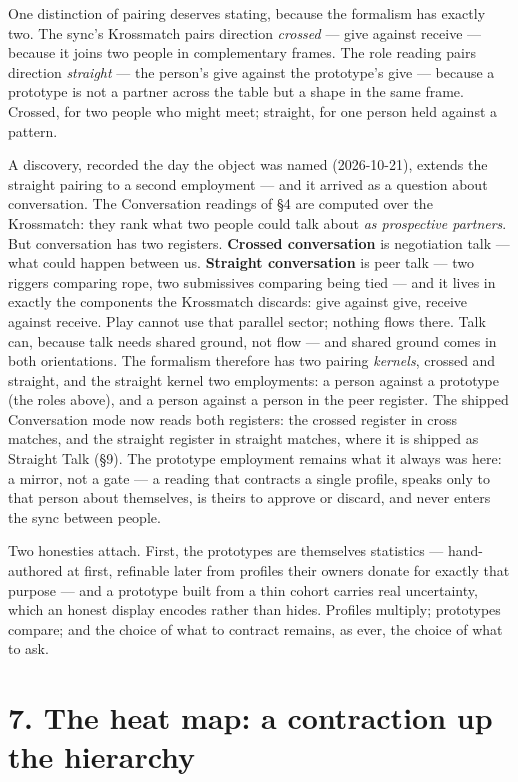 One distinction of pairing deserves stating, because the formalism has
exactly two. The sync's Krossmatch pairs direction \emph{crossed} ---
give against receive --- because it joins two people in complementary
frames. The role reading pairs direction \emph{straight} --- the
person's give against the prototype's give --- because a prototype is
not a partner across the table but a shape in the same frame. Crossed,
for two people who might meet; straight, for one person held against a
pattern.

A discovery, recorded the day the object was named (2026-10-21), extends
the straight pairing to a second employment --- and it arrived as a
question about conversation. The Conversation readings of \S 4 are
computed over the Krossmatch: they rank what two people could talk about
\emph{as prospective partners}. But conversation has two registers.
\textbf{Crossed conversation} is negotiation talk --- what could happen
between us. \textbf{Straight conversation} is peer talk --- two riggers
comparing rope, two submissives comparing being tied --- and it lives in
exactly the components the Krossmatch discards: give against give,
receive against receive. Play cannot use that parallel sector; nothing
flows there. Talk can, because talk needs shared ground, not flow ---
and shared ground comes in both orientations. The formalism therefore
has two pairing \emph{kernels}, crossed and straight, and the straight
kernel two employments: a person against a prototype (the roles above),
and a person against a person in the peer register. The shipped
Conversation mode now reads both registers: the crossed register in
cross matches, and the straight register in straight matches, where it
is shipped as Straight Talk (\S 9). The prototype employment remains what
it always was here: a mirror, not a gate --- a reading that contracts a
single profile, speaks only to that person about themselves, is theirs
to approve or discard, and never enters the sync between people.

Two honesties attach. First, the prototypes are themselves statistics
--- hand-authored at first, refinable later from profiles their owners
donate for exactly that purpose --- and a prototype built from a thin
cohort carries real uncertainty, which an honest display encodes rather
than hides. Profiles multiply; prototypes compare; and the choice of
what to contract remains, as ever, the choice of what to ask.

\section{7. The heat map: a contraction up the
hierarchy}\label{the-heat-map-a-contraction-up-the-hierarchy}

